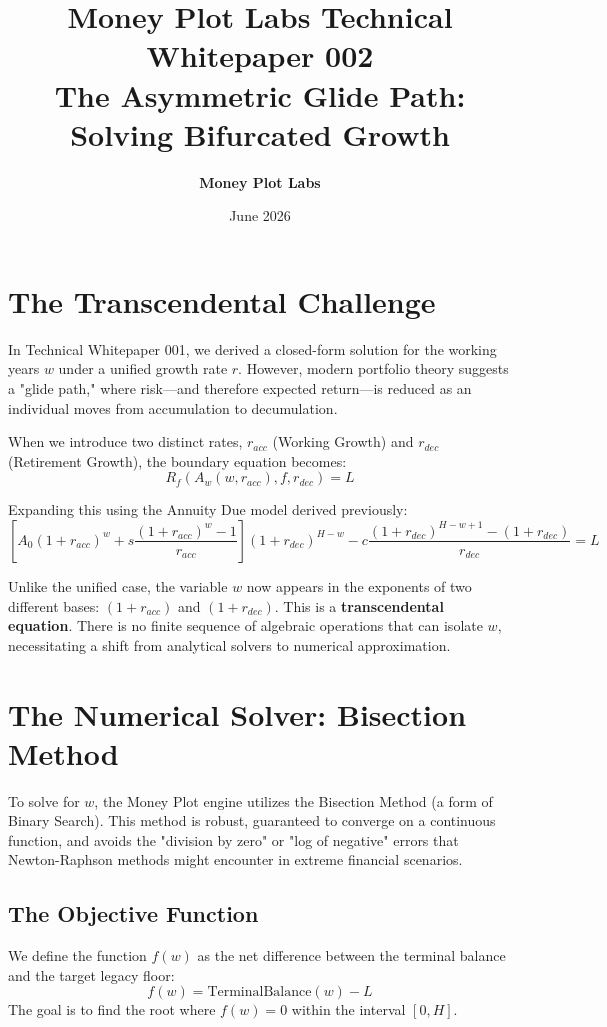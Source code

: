 \documentclass[11pt,letterpaper]{article}
\title{\vspace{-20pt}\textbf{\color{mpdark}Money Plot Labs Technical Whitepaper 002 \\ The Asymmetric Glide Path: Solving Bifurcated Growth}}
\author{\textbf{Money Plot Labs}}
\date{June 2026}
\begin{document}
\maketitle

\section{The Transcendental Challenge}
In Technical Whitepaper 001, we derived a closed-form solution for the working years $w$ under a unified growth rate $r$. However, modern portfolio theory suggests a "glide path," where risk—and therefore expected return—is reduced as an individual moves from accumulation to decumulation. 

When we introduce two distinct rates, $r_{acc}$ (Working Growth) and $r_{dec}$ (Retirement Growth), the boundary equation becomes:
\begin{equation}
    R_f(A_w(w, r_{acc}), f, r_{dec}) = L
\end{equation}

Expanding this using the Annuity Due model derived previously:
\begin{equation}
    \left[ A_0(1+r_{acc})^w + s \frac{(1+r_{acc})^w - 1}{r_{acc}} \right] (1+r_{dec})^{H-w} - c \frac{(1+r_{dec})^{H-w+1} - (1+r_{dec})}{r_{dec}} = L
\end{equation}

Unlike the unified case, the variable $w$ now appears in the exponents of two different bases: $(1+r_{acc})$ and $(1+r_{dec})$. This is a \textbf{transcendental equation}. There is no finite sequence of algebraic operations that can isolate $w$, necessitating a shift from analytical solvers to numerical approximation.

\section{The Numerical Solver: Bisection Method}
To solve for $w$, the Money Plot engine utilizes the Bisection Method (a form of Binary Search). This method is robust, guaranteed to converge on a continuous function, and avoids the "division by zero" or "log of negative" errors that Newton-Raphson methods might encounter in extreme financial scenarios.

\subsection{The Objective Function}
We define the function $f(w)$ as the net difference between the terminal balance and the target legacy floor:
\begin{equation}
    f(w) = \text{TerminalBalance}(w) - L
\end{equation}
The goal is to find the root where $f(w) = 0$ within the interval $[0, H]$.
\end{document}
